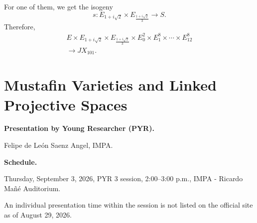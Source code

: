 For one of them, we get the isogeny
$$
s\colon
E_{1+i\sqrt{2}}
\times
E_{\frac{1+i\sqrt{2}}{3}}
\longrightarrow S.
$$
Therefore,
$$
\boxed{
\begin{gathered}
E\times E_{1+i\sqrt{2}}
\times E_{\frac{1+i\sqrt{2}}{3}}
\times E_0^2\times E_1^8
\times\cdots\times E_{12}^8\\
\longrightarrow JX_{101}.
\end{gathered}
}
$$


































































\section{Mustafin Varieties and Linked
Projective Spaces}
\label{section-mustafin-varieties}

\medskip\noindent
{\bf Presentation by Young Researcher
(PYR).}

Felipe de Le\'on Saenz Angel,
IMPA.

\medskip\noindent
{\bf Schedule.}

Thursday, September 3, 2026,
PYR 3 session, 2:00--3:00 p.m.,
IMPA - Ricardo Ma\~n\'e Auditorium.

An individual presentation time within
the session is not listed on the
official site as of August 29, 2026.

